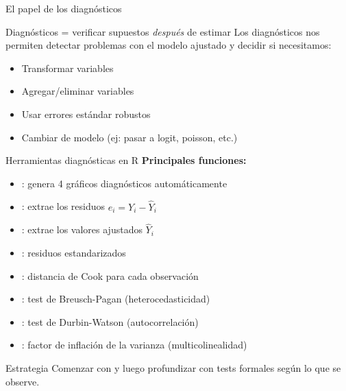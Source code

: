 \documentclass[aspectratio=169, 11pt]{beamer}
\begin{document}
\begin{frame}{El papel de los diagnósticos}
\begin{block}{Diagnósticos = verificar supuestos \textit{después} de estimar}
Los diagnósticos nos permiten detectar problemas con el modelo ajustado y decidir si necesitamos:
\begin{itemize}
\item Transformar variables
\item Agregar/eliminar variables
\item Usar errores estándar robustos
\item Cambiar de modelo (ej: pasar a logit, poisson, etc.)
\end{itemize}
\end{block}

\vspace{0.15cm}
\begin{center}
\end{center}
\end{frame}

\begin{frame}{Herramientas diagnósticas en R}
\textbf{Principales funciones:}
\begin{itemize}
\item {}: genera 4 gráficos diagnósticos automáticamente
\item {}: extrae los residuos $e_i = Y_i - \hat{Y}_i$
\item {}: extrae los valores ajustados $\hat{Y}_i$
\item {}: residuos estandarizados
\item {}: distancia de Cook para cada observación
\item {}: test de Breusch-Pagan (heterocedasticidad)
\item {}: test de Durbin-Watson (autocorrelación)
\item {}: factor de inflación de la varianza (multicolinealidad)
\end{itemize}

\vspace{0.3cm}
\begin{alertblock}{Estrategia}
Comenzar con  y luego profundizar con tests formales según lo que se observe.
\end{alertblock}
\end{frame}
\end{document}
